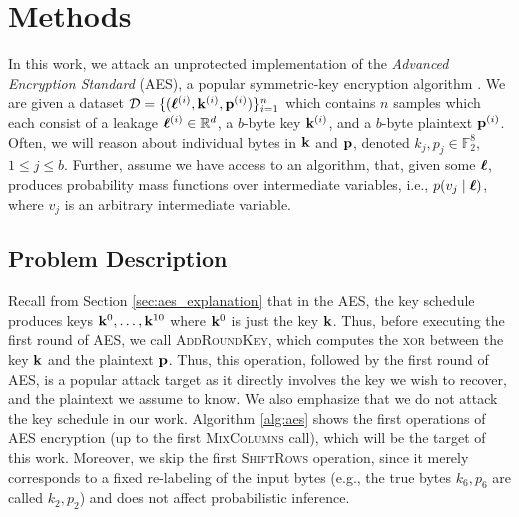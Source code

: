 \newcommand{\src}{\mathcal{D}_s}
\newcommand{\tar}{\mathcal{D}_t}
\newcommand{\x}{\mathbf{x}}
\newcommand{\z}{\mathbf{z}}
\newcommand{\mub}{\mathbf{\mu}}
\newcommand{\Sigmab}{\mathbf{\Sigmab}}
\newcommand{\lsimple}{\mathcal{L}_{\text{simple}}}
\newcommand{\be}{\bm{\epsilon}}


\chapter{Methods}
\label{cha:methods}

In this work, we attack an unprotected implementation of the \textit{Advanced Encryption Standard} (AES), a popular symmetric-key encryption algorithm \cite{aes}.
We are given a dataset $\mathcal{D} = \{(\boldsymbol{\ell}^{(i)}, \mathbf{k}^{(i)}, \mathbf{p}^{(i)})\}_{i=1}^n$ which contains $n$ samples which each consist of a leakage $\boldsymbol{\ell}^{(i)} \in \mathbb{R}^d$, a $b$-byte key $\mathbf{k}^{(i)}$, and a $b$-byte plaintext $\mathbf{p}^{(i)}$. 
Often, we will reason about individual bytes in $\mathbf{k}$ and $\mathbf{p}$, denoted $k_j, p_j \in \mathbb{F}_2^8$, $1 \leq j \leq b$. 
Further, assume we have access to an algorithm, that, given some $\boldsymbol{\ell}$, produces probability mass functions over intermediate variables, i.e., $p(v_j \mid \boldsymbol{\ell})$, where $v_j$ is an arbitrary intermediate variable.

\section{Problem Description}
Recall from Section \ref{sec:aes_explanation} that in the AES, the key schedule produces keys $\mathbf{k}^0,\dots,\mathbf{k}^{10}$ where $\mathbf{k}^0$ is just the key $\mathbf{k}$. Thus, before executing the first round of AES, we call \textsc{AddRoundKey}, which computes the \textsc{xor} between the key $\mathbf{k}$ and the plaintext $\mathbf{p}$. Thus, this operation, followed by the first round of AES, is a popular attack target as it directly involves the key we wish to recover, and the plaintext we assume to know. We also emphasize that we do not attack the key schedule in our work.
Algorithm \ref{alg:aes} shows the first operations of AES encryption (up to the first \textsc{MixColumns} call), which will be the target of this work. Moreover, we skip the first \textsc{ShiftRows} operation, since it merely corresponds to a fixed re-labeling of the input bytes (e.g., the true bytes $k_6, p_6$ are called $k_2, p_2$) and does not affect probabilistic inference.

